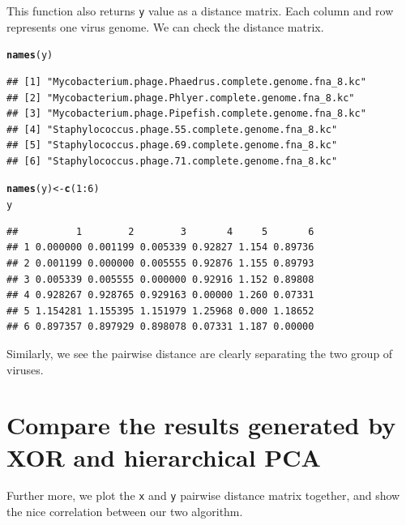 \documentclass{article}\usepackage[]{graphicx}\usepackage[]{color}
\makeatletter
\newcommand{\hlnum}[1]{\textcolor[rgb]{0.686,0.059,0.569}{#1}}%
\newcommand{\hlopt}[1]{\textcolor[rgb]{0,0,0}{#1}}%
\newcommand{\hlstd}[1]{\textcolor[rgb]{0.345,0.345,0.345}{#1}}%
\newcommand{\hlkwb}[1]{\textcolor[rgb]{0.69,0.353,0.396}{#1}}%
\newcommand{\hlkwd}[1]{\textcolor[rgb]{0.737,0.353,0.396}{\textbf{#1}}}%
\newenvironment{kframe}{%
 \def\at@end@of@kframe{}%
 \ifinner\ifhmode%
  \def\at@end@of@kframe{\end{minipage}}%
  \begin{minipage}{\columnwidth}%
 \fi\fi%
 \def\FrameCommand##1{\hskip\@totalleftmargin \hskip-\fboxsep
 \colorbox{shadecolor}{##1}\hskip-\fboxsep
     \hskip-\linewidth \hskip-\@totalleftmargin \hskip\columnwidth}%
 \MakeFramed {\advance\hsize-\width
   \@totalleftmargin\z@ \linewidth\hsize
   \@setminipage}}%
 {\par\unskip\endMakeFramed%
 \at@end@of@kframe}
\newenvironment{knitrout}{}{} %
\makeatother
\begin{document}
This function also  returns \texttt{y} value as a distance matrix. Each column and row represents one virus genome. We can check the distance matrix.

\begin{knitrout}
\color{fgcolor}\begin{kframe}
\begin{alltt}
\hlkwd{names}\hlstd{(y)}
\end{alltt}
\begin{verbatim}
## [1] "Mycobacterium.phage.Phaedrus.complete.genome.fna_8.kc"
## [2] "Mycobacterium.phage.Phlyer.complete.genome.fna_8.kc"  
## [3] "Mycobacterium.phage.Pipefish.complete.genome.fna_8.kc"
## [4] "Staphylococcus.phage.55.complete.genome.fna_8.kc"     
## [5] "Staphylococcus.phage.69.complete.genome.fna_8.kc"     
## [6] "Staphylococcus.phage.71.complete.genome.fna_8.kc"
\end{verbatim}
\begin{alltt}
\hlkwd{names}\hlstd{(y)} \hlkwb{<-} \hlkwd{c}\hlstd{(}\hlnum{1}\hlopt{:}\hlnum{6}\hlstd{)}
\hlstd{y}
\end{alltt}
\begin{verbatim}
##          1        2        3       4     5       6
## 1 0.000000 0.001199 0.005339 0.92827 1.154 0.89736
## 2 0.001199 0.000000 0.005555 0.92876 1.155 0.89793
## 3 0.005339 0.005555 0.000000 0.92916 1.152 0.89808
## 4 0.928267 0.928765 0.929163 0.00000 1.260 0.07331
## 5 1.154281 1.155395 1.151979 1.25968 0.000 1.18652
## 6 0.897357 0.897929 0.898078 0.07331 1.187 0.00000
\end{verbatim}
\end{kframe}
\end{knitrout}

Similarly, we see the pairwise distance are clearly separating the two group of viruses.\\


\section{Compare the results generated by XOR and hierarchical PCA}
\label{kmerDistance.dif}

Further more, we plot the \texttt{x} and \texttt{y} pairwise distance matrix together, and show the nice correlation between our two algorithm.
\end{document}
